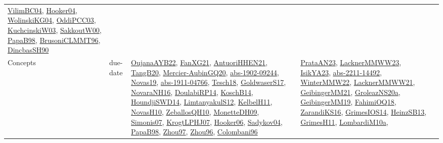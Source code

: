 {\begin{longtable}{lp{3cm}>{\raggedright}p{6cm}>{\raggedright}p{6cm}p{8cm}}
\href{papers/VilimBC04.pdf}{VilimBC04}\cite{VilimBC04}, \href{papers/Hooker04.pdf}{Hooker04}\cite{Hooker04}, \href{papers/WolinskiKG04.pdf}{WolinskiKG04}\cite{WolinskiKG04}, \href{papers/OddiPCC03.pdf}{OddiPCC03}\cite{OddiPCC03}, \href{articles/KuchcinskiW03.pdf}{KuchcinskiW03}\cite{KuchcinskiW03}, \href{articles/SakkoutW00.pdf}{SakkoutW00}\cite{SakkoutW00}, \href{articles/PapaB98.pdf}{PapaB98}\cite{PapaB98}, \href{papers/BrusoniCLMMT96.pdf}{BrusoniCLMMT96}\cite{BrusoniCLMMT96}, \href{articles/DincbasSH90.pdf}{DincbasSH90}\cite{DincbasSH90}\\
Concepts & due-date & \href{papers/OujanaAYB22.pdf}{OujanaAYB22}\cite{OujanaAYB22}, \href{articles/FanXG21.pdf}{FanXG21}\cite{FanXG21}, \href{papers/AntuoriHHEN21.pdf}{AntuoriHHEN21}\cite{AntuoriHHEN21}, \href{papers/TangB20.pdf}{TangB20}\cite{TangB20}, \href{papers/Mercier-AubinGQ20.pdf}{Mercier-AubinGQ20}\cite{Mercier-AubinGQ20}, \href{articles/abs-1902-09244.pdf}{abs-1902-09244}\cite{abs-1902-09244}, \href{articles/Novas19.pdf}{Novas19}\cite{Novas19}, \href{articles/abs-1911-04766.pdf}{abs-1911-04766}\cite{abs-1911-04766}, \href{papers/Tesch18.pdf}{Tesch18}\cite{Tesch18}, \href{papers/GoldwaserS17.pdf}{GoldwaserS17}\cite{GoldwaserS17}, \href{articles/NovaraNH16.pdf}{NovaraNH16}\cite{NovaraNH16}, \href{papers/DoulabiRP14.pdf}{DoulabiRP14}\cite{DoulabiRP14}, \href{papers/KoschB14.pdf}{KoschB14}\cite{KoschB14}, \href{papers/HoundjiSWD14.pdf}{HoundjiSWD14}\cite{HoundjiSWD14}, \href{articles/LimtanyakulS12.pdf}{LimtanyakulS12}\cite{LimtanyakulS12}, \href{articles/KelbelH11.pdf}{KelbelH11}\cite{KelbelH11}, \href{articles/NovasH10.pdf}{NovasH10}\cite{NovasH10}, \href{articles/ZeballosQH10.pdf}{ZeballosQH10}\cite{ZeballosQH10}, \href{papers/MonetteDH09.pdf}{MonetteDH09}\cite{MonetteDH09}, \href{articles/Simonis07.pdf}{Simonis07}\cite{Simonis07}, \href{papers/KrogtLPHJ07.pdf}{KrogtLPHJ07}\cite{KrogtLPHJ07}, \href{articles/Hooker06.pdf}{Hooker06}\cite{Hooker06}, \href{papers/Sadykov04.pdf}{Sadykov04}\cite{Sadykov04}, \href{articles/PapaB98.pdf}{PapaB98}\cite{PapaB98}, \href{articles/Zhou97.pdf}{Zhou97}\cite{Zhou97}, \href{papers/Zhou96.pdf}{Zhou96}\cite{Zhou96}, \href{papers/Colombani96.pdf}{Colombani96}\cite{Colombani96} & \href{articles/PrataAN23.pdf}{PrataAN23}\cite{PrataAN23}, \href{articles/LacknerMMWW23.pdf}{LacknerMMWW23}\cite{LacknerMMWW23}, \href{articles/IsikYA23.pdf}{IsikYA23}\cite{IsikYA23}, \href{articles/abs-2211-14492.pdf}{abs-2211-14492}\cite{abs-2211-14492}, \href{papers/WinterMMW22.pdf}{WinterMMW22}\cite{WinterMMW22}, \href{papers/LacknerMMWW21.pdf}{LacknerMMWW21}\cite{LacknerMMWW21}, \href{papers/GeibingerMM21.pdf}{GeibingerMM21}\cite{GeibingerMM21}, \href{papers/GroleazNS20a.pdf}{GroleazNS20a}\cite{GroleazNS20a}, \href{papers/GeibingerMM19.pdf}{GeibingerMM19}\cite{GeibingerMM19}, \href{articles/FahimiOQ18.pdf}{FahimiOQ18}\cite{FahimiOQ18}, \href{articles/ZarandiKS16.pdf}{ZarandiKS16}\cite{ZarandiKS16}, \href{articles/GrimesIOS14.pdf}{GrimesIOS14}\cite{GrimesIOS14}, \href{articles/HeinzSB13.pdf}{HeinzSB13}\cite{HeinzSB13}, \href{papers/GrimesH11.pdf}{GrimesH11}\cite{GrimesH11}, \href{articles/LombardiM10a.pdf}{LombardiM10a}\cite{LombardiM10a}, 
\end{longtable}}
